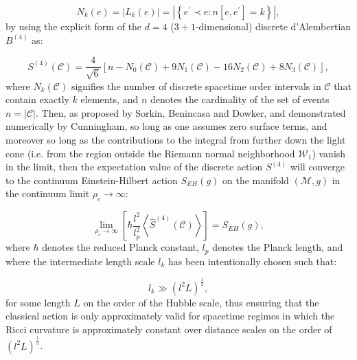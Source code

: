 \documentclass{article}
\begin{document}
\begin{equation}
N_k \left( e \right) = \left\lvert L_k \left( e \right) \right\rvert = \left\lvert \left\lbrace e^{\prime} \prec e : n \left[ e, e^{\prime} \right] = k \right\rbrace \right\rvert,
\end{equation}
by using the explicit form of the ${d = 4}$ (${3 + 1}$-dimensional) discrete d'Alembertian ${B^{\left( 4 \right)}}$ as:

\begin{equation}
S^{\left( 4 \right)} \left( \mathcal{C} \right) = \frac{4}{\sqrt{6}} \left[ n - N_0 \left( \mathcal{C} \right) + 9 N_1 \left( \mathcal{C} \right) - 16 N_2 \left( \mathcal{C} \right) + 8 N_3 \left( \mathcal{C} \right) \right],
\end{equation}
where ${N_k \left( \mathcal{C} \right)}$ signifies the number of discrete spacetime order intervals in ${\mathcal{C}}$ that contain exactly $k$ elements, and $n$ denotes the cardinality of the set of events ${n = \left\lvert \mathcal{C} \right\rvert}$. Then, as proposed by Sorkin, Benincasa and Dowker, and demonstrated numerically by Cunningham\cite{cunningham}, so long as one assumes zero surface terms, and moreover so long as the contributions to the integral from further down the light cone (i.e. from the region outside the Riemann normal neighborhood ${\mathcal{W}_1}$) vanish in the limit, then the expectation value of the discrete action ${S^{\left( 4 \right)}}$ will converge to the continuum Einstein-Hilbert action ${S_{EH} \left( g \right)}$ on the manifold ${\left( \mathcal{M}, g \right)}$ in the continuum limit ${\rho_c \to \infty}$:

\begin{equation}
\lim_{\rho_c \to \infty} \left[ \hbar \frac{l^2}{l_{p}^{2}} \left\langle \hat{S}^{\left( 4 \right)} \left( \mathcal{C} \right) \right\rangle \right] = S_{EH} \left( g \right),
\end{equation}
where ${\hbar}$ denotes the reduced Planck constant, ${l_p}$ denotes the Planck length, and where the intermediate length scale ${l_k}$ has been intentionally chosen such that:

\begin{equation}
l_k \gg \left( l^2 L \right)^{\frac{1}{3}},
\end{equation}
for some length $L$ on the order of the Hubble scale, thus ensuring that the classical action is only approximately valid for spacetime regimes in which the Ricci curvature is approximately constant over distance scales on the order of ${\left( l^2 L \right)^{\frac{1}{3}}}$.
\end{document}
